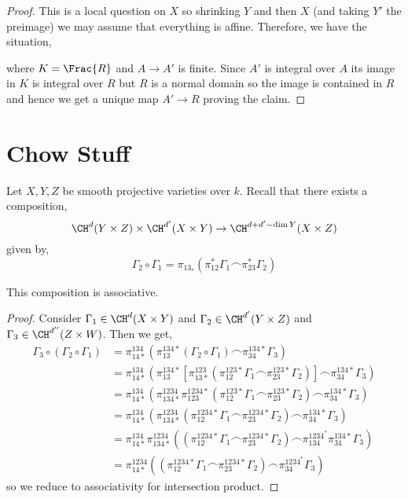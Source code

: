 \documentclass[12pt]{article}
\begin{document}
\begin{proof}
This is a local question on $X$ so shrinking $Y$ and then $X$ (and taking $Y'$ the preimage) we may assume that everything is affine. Therefore, we have the situation,
\begin{center}
\end{center}
where $K = \Frac{R}$ and $A \to A'$ is finite. Since $A'$ is integral over $A$ its image in $K$ is integral over $R$ but $R$ is a normal domain so the image is contained in $R$ and hence we get a unique map $A' \to R$ proving the claim. 
\end{proof}

\section{Chow Stuff}

Let $X, Y, Z$ be smooth projective varieties over $k$. Recall that there exists a composition,
\[ \CH^{d}(Y \times Z) \times \CH^{d'}(X \times Y) \to \CH^{d+d' - \dim{Y}}(X \times Z) \]
given by,
\[ \Gamma_2 \circ \Gamma_1 = \pi_{13_*}(\pi_{12}^* \Gamma_1 \frown \pi_{23}^* \Gamma_2) \]

\begin{lemma}
This composition is associative.
\end{lemma}

\begin{proof}
Consider $\Gamma_1 \in \CH^{d}(X \times Y)$ and $\Gamma_2 \in \CH^{d'}(Y \times Z)$ and $\Gamma_3 \in \CH^{d''}(Z \times W)$. Then we get,
\begin{align*}
\Gamma_3 \circ (\Gamma_2 \circ \Gamma_1) &= \pi^{134}_{14 *} (\pi_{13}^{134*} (\Gamma_2 \circ \Gamma_1) \frown \pi_{34}^{134*} \Gamma_3)
\\
&= \pi^{134}_{14 *} (\pi_{13}^{134*} [\pi^{123}_{13*} (\pi^{123*}_{12} \Gamma_1 \frown \pi^{123*}_{23} \Gamma_2)] \frown \pi_{34}^{134*} \Gamma_3)
\\
&= \pi^{134}_{14 *} ( \pi^{1234}_{134*} \pi^{1234*}_{123} (\pi^{123*}_{12} \Gamma_1 \frown \pi^{123*}_{23} \Gamma_2) \frown \pi_{34}^{134*} \Gamma_3)
\\
&= \pi^{134}_{14 *} ( \pi^{1234}_{134*} (\pi^{1234*}_{12} \Gamma_1 \frown \pi^{1234*}_{23} \Gamma_2) \frown \pi_{34}^{134*} \Gamma_3)
\\
&= \pi^{134}_{14 *}  \pi^{1234}_{134*} ((\pi^{1234*}_{12} \Gamma_1 \frown \pi^{1234*}_{23} \Gamma_2) \frown  \pi^{1234^*}_{134} \pi_{34}^{134*} \Gamma_3)
\\
& = \pi^{1234}_{14*} ((\pi^{1234*}_{12} \Gamma_1 \frown \pi^{1234*}_{23} \Gamma_2) \frown  \pi^{1234^*}_{34} \Gamma_3)
\end{align*}
so we reduce to associativity for intersection product.
\end{proof}
\end{document}

